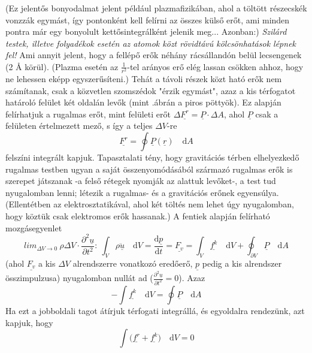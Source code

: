 \documentclass[a4paper, 12pt, titlepage]{article}
\begin{document}
(Ez jelentős bonyodalmat jelent például plazmafizikában, ahol a töltött részecskék vonzzák egymást, így pontonként kell felírni az összes külső erőt, ami minden pontra már egy bonyolult kettősintegrálként jelenik meg... Azonban:) \textit{Szilárd testek, illetve folyadékok esetén az atomok közt rövidtávú kölcsönhatások lépnek fel!} Ami annyit jelent, hogy a fellépő erők néhány rácsállandón belül lecsengenek (2 \si{\angstrom} körül). (Plazma esetén az $\frac{1}{r^{2}}$-tel arányos erő elég lassan csökken ahhoz, hogy ne lehessen eképp egyszerűsíteni.)
Tehát a távoli részek közt ható erők nem számítanak, csak a közvetlen szomszédok "érzik egymást", azaz a kis térfogatot határoló felület két oldalán levők (mint .\hspace{1mm}ábrán a piros pöttyök). Ez alapján felírhatjuk a rugalmas erőt, mint felületi erőt $\Delta\underline{F^{r}}=\underline{P}\cdot\Delta A$, ahol $\underline{P}$ csak a felületen értelmezett mező, s így a teljes $\Delta V$-re
\[\underline{F^{r}}=\oint\underline{P}(\underline{r})\quad\mathrm{d}A\]
felszíni integrált kapjuk. %
\newline
Tapasztalati tény, hogy gravitációs térben elhelyezkedő rugalmas testben ugyan a saját összenyomódásából származó rugalmas erők is szerepet játszanak -a felső rétegek nyomják az alattuk levőket-, a test tud nyugalomban lenni; létezik a rugalmas- és a gravitációs erőnek egyensúlya. (Ellentétben az elektrosztatikával, ahol két töltés nem lehet úgy nyugalomban, hogy köztük csak elektromos erők hassanak.) A fentiek alapján felírható mozgásegyenlet
	\begin{equation}
 l i m_{\Delta V\to 0} \  \rho\Delta V\cdot\frac{\partial^{2}\underline{u}}{\partial t^{2}}: \ \int_{V}\rho\underline{\ddot{u}}\quad\mathrm{d}V=\frac{\mathrm{d}\underline{p}}{\mathrm{d}t}=\underline{F_{v}}=\int_{V}\underline{f^{k}}\quad\mathrm{d}V+\oint_{\partial V}\underline{P}\quad\mathrm{d}A
	\label{eq:Fv}
	\end{equation} %
(ahol $\underline{F_{v}}$ a kis $\Delta V$ alrendszerre vonatkozó eredőerő, $\underline{p}$ pedig a kis alrendszer összimpulzusa) nyugalomban nullát ad ($\frac{\partial^{2}\underline{u}}{\partial t^{2}}=0$). Azaz
	\begin{equation}
-\int\underline{f^{k}}\quad\mathrm{d}V=\oint\underline{P}\quad\mathrm{d}A
	\label{eq:gauss}
	\end{equation}
Ha ezt a jobboldali tagot átírjuk térfogati integrállá, és egyoldalra rendezünk, azt kapjuk, hogy
	\begin{equation}
\int\bigg(\underline{f^{r}}+\underline{f^{k}}\bigg)\quad\mathrm{d}V=0
	\label{eq:kiegy}
	\end{equation}
\end{document}
